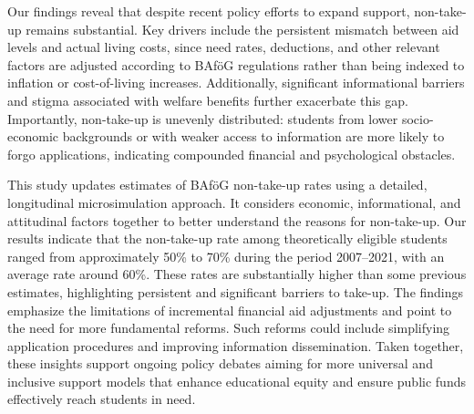 Our findings reveal that despite recent policy efforts to expand support, non-take-up remains substantial. 
Key drivers include the persistent mismatch between aid levels and actual living costs, since need rates, deductions, and other relevant factors are adjusted according to BAföG regulations rather than being indexed to inflation or cost-of-living increases. 
Additionally, significant informational barriers and stigma associated with welfare benefits further exacerbate this gap.
Importantly, non-take-up is unevenly distributed: students from lower socio-economic backgrounds or with weaker access to information are more likely to forgo applications, indicating compounded financial and psychological obstacles.

This study updates estimates of BAföG non-take-up rates using a detailed, longitudinal microsimulation approach. 
It considers economic, informational, and attitudinal factors together to better understand the reasons for non-take-up.
Our results indicate that the non-take-up rate among theoretically eligible students ranged from approximately 50\% to 70\% during the period 2007--2021, with an average rate around 60\%. 
These rates are substantially higher than some previous estimates, highlighting persistent and significant barriers to take-up. 
The findings emphasize the limitations of incremental financial aid adjustments and point to the need for more fundamental reforms. 
Such reforms could include simplifying application procedures and improving information dissemination.
Taken together, these insights support ongoing policy debates aiming for more universal and inclusive support models that enhance educational equity and ensure public funds effectively reach students in need.
